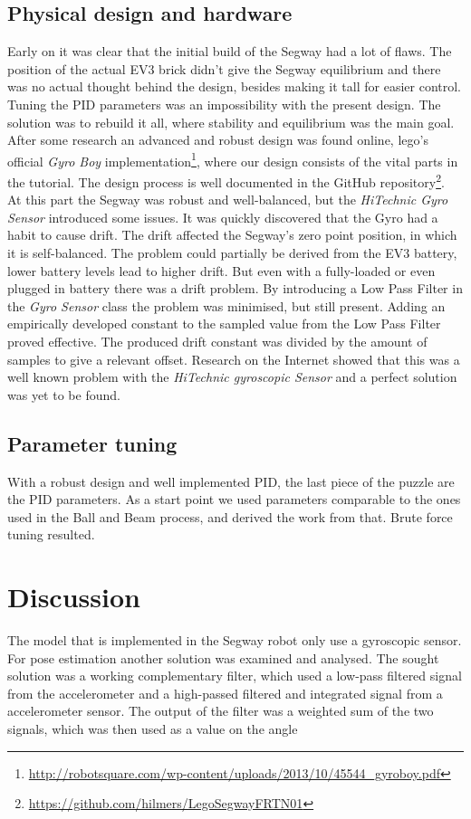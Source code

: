 \subsection{Physical design and hardware}
Early on it was clear that the initial build of the Segway had a lot of flaws. The position of the actual EV3 brick didn't give the Segway equilibrium and there was no actual thought behind the design, besides making it tall for easier control. Tuning the PID parameters was an impossibility with the present design. The solution was to rebuild it all, where stability and equilibrium was the main goal. After some research an advanced and robust design was found online, lego's official {\it Gyro Boy}   implementation\footnote{\url{http://robotsquare.com/wp-content/uploads/2013/10/45544_gyroboy.pdf}}, where our design consists of the vital parts in the tutorial. The design process is well documented in the GitHub repository\footnote{\url{https://github.com/hilmers/LegoSegwayFRTN01}}. 
\\[3ex]
At this part the Segway was robust and well-balanced, but the {\it HiTechnic Gyro Sensor} introduced some issues. It was quickly discovered that the Gyro had a habit to cause drift. The drift affected the Segway's zero point position, in which it is self-balanced. The problem could partially be derived from the EV3 battery, lower battery levels lead to higher drift. But even with a fully-loaded or even plugged in battery there was a drift problem. By introducing a Low Pass Filter in the {\it Gyro Sensor} class the problem was minimised, but still present. Adding an empirically developed constant to the sampled value from the Low Pass Filter proved effective. The produced drift constant was divided by the amount of samples to give a relevant offset. Research on the Internet showed that this was a well known problem with the {\it HiTechnic gyroscopic Sensor} and a perfect solution was yet to be found.    

\subsection{Parameter tuning}
With a robust design and well implemented PID, the last piece of the puzzle are the PID parameters. As a start point we used parameters comparable to the ones used in the Ball and Beam process, and derived the work from that. Brute force tuning resulted.

\section{Discussion}
The model that is implemented in the Segway robot only use a gyroscopic sensor. For pose estimation another solution was examined and analysed. The sought solution was a working complementary filter, which used a low-pass filtered signal from the accelerometer and a high-passed filtered and integrated signal from a accelerometer sensor. The output of the filter was a weighted sum of the two signals, which was then used as a value on the angle 
 
